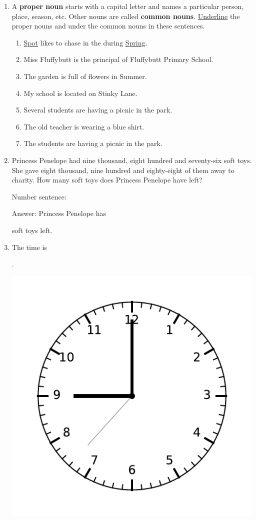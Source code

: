 \documentclass{tufte-book}
\begin{document}
\begin{enumerate}
  \item A \textbf{proper noun} starts with a capital letter and names a particular person, place, season, etc. Other nouns are called \textbf{common nouns}.
  \underline{Underline} the proper nouns and  under the common nouns in these sentences.
  \begin{enumerate}
    \item \underline{Spot} likes to chase  in the  during \underline{Spring}.
    \item Miss Fluffybutt is the principal of Fluffybutt Primary School.
    \item The garden is full of flowers in Summer.
    \item My school is located on Stinky Lane.
    \item Several students are having a picnic in the park.
    \item The old teacher is wearing a blue shirt.
    \item The students are having a picnic in the park.
  \end{enumerate}

  \item Princess Penelope had nine thousand, eight hundred and seventy-six soft toys.
  She gave eight thousand, nine hundred and eighty-eight of them away to charity. 
  How many soft toys does Princess Penelope have left?\bigskip\par
  Number sentence: \dotfill\bigskip\par
  Answer: Princess Penelope has \dotfill\bigskip\par\dotfill\bigskip soft toys left.

  \item The time is \dotfill\bigskip\par\dotfill\bigskip.
  \begin{marginfigure}\includegraphics[width=\textwidth]{maths/fig/clock_0900.pdf}\end{marginfigure}


\end{enumerate}
\end{document}
